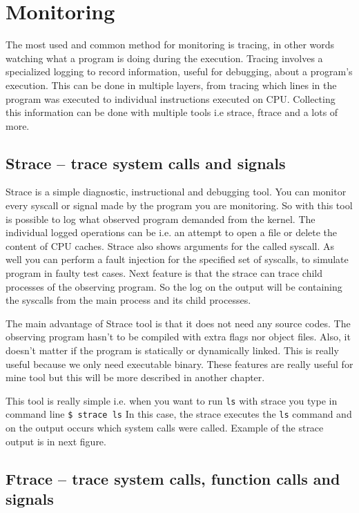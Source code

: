 \section{Monitoring}
The most used and common method for monitoring is tracing, in other words watching what a program is doing during the execution.
Tracing involves a specialized logging to record information, useful for debugging, about a program's execution.
This can be done in multiple layers, from tracing which lines in the program was executed to individual instructions executed on CPU.
Collecting this information can be done with multiple tools i.e strace, ftrace and a lots of more.

\subsection{Strace -- trace system calls and signals}

Strace is a simple diagnostic, instructional and debugging tool.
You can monitor every syscall or signal made by the program you are monitoring.
So with this tool is possible to log what observed program demanded from the kernel.
The individual logged operations can be i.e. an attempt to open a file or delete the content of CPU caches.
Strace also shows arguments for the called syscall.
As well you can perform a fault injection for the specified set of syscalls, to simulate program in faulty test cases.
Next feature is that the strace can trace child processes of the observing program.
So the log on the output will be containing the syscalls from the main process and its child processes.

The main advantage of Strace tool is that it does not need any source codes.
The observing program hasn't to be compiled with extra flags nor object files.
Also, it doesn't matter if the program is statically or dynamically linked.
This is really useful because we only need executable binary.
These features are really useful for mine tool but this will be more described in another chapter.

This tool is really simple i.e. when you want to run \texttt{ls} with strace you type in command line \texttt{\$ strace ls}
In this case, the strace executes the \texttt{ls} command and on the output occurs which system calls were called.
Example of the strace output is in next figure. 

\subsection{Ftrace -- trace system calls, function calls and signals}
